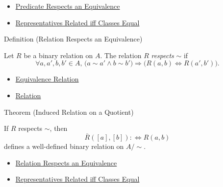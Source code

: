 \begin{dependencies}
\begin{itemize}
  \item \hyperref[def:predicate-respects-equivalence]{Predicate Respects an Equivalence}
  \item \hyperref[prop:representatives-related-iff-classes-equal]{Representatives Related iff Classes Equal}
\end{itemize}
\end{dependencies}

\begin{definitionbox}{Definition (Relation Respects an Equivalence)}
\begin{definition}
\label{def:relation-respects-equivalence}
Let $R$ be a binary relation on $A$. The relation $R$ \emph{respects} $\sim$
if
\[
\forall a,a',b,b'\in A,\,
\bigl(a\sim a'\land b\sim b'\bigr)
\Longrightarrow
\bigl(R(a,b)\Longleftrightarrow R(a',b')\bigr).
\]
\end{definition}
\end{definitionbox}

\begin{dependencies}
\begin{itemize}
  \item \hyperref[def:equivalence-relation]{Equivalence Relation}
  \item \hyperref[def:relation]{Relation}
\end{itemize}
\end{dependencies}

\begin{theorembox}{Theorem (Induced Relation on a Quotient)}
\begin{theorem}
\label{thm:induced-relation-on-quotient}
If $R$ respects $\sim$, then
\[
\overline{R}([a],[b]):\Longleftrightarrow R(a,b)
\]
defines a well-defined binary relation on $A/{\sim}$.
\end{theorem}
\end{theorembox}

\begin{dependencies}
\begin{itemize}
  \item \hyperref[def:relation-respects-equivalence]{Relation Respects an Equivalence}
  \item \hyperref[prop:representatives-related-iff-classes-equal]{Representatives Related iff Classes Equal}
\end{itemize}
\end{dependencies}

